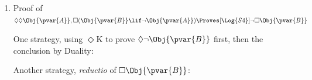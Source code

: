 \documentclass[../../../include/open-logic-section]{subfiles}
\begin{document}
\begin{prob}
\begin{ans}
\begin{enumerate}
        \item Proof of $\Diamond\Diamond \Obj{\pvar{A}},
        \Box(\Obj{\pvar{B}}\lif\lnot\Obj{\pvar{A}})
        \Proves[\Log{S4}] \lnot\Box\Obj{\pvar{B}}$

        One strategy, using $\Diamond$K to prove
        $\Diamond\lnot\Obj{\pvar{B}}$ first, then the conclusion by
        Duality:

        \begin{prooftree}
            \end{prooftree}
    
        Another strategy, \emph{reductio} of $\Box\Obj{\pvar{B}}$:
        \begin{prooftree}
        \end{prooftree}
    

\end{enumerate}
\end{ans}
\end{prob}
\end{document}
